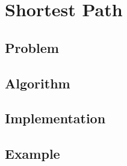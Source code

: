 \chapter{Shortest Path}


\section{Problem}

\section{Algorithm}

\section{Implementation}

\section{Example}

